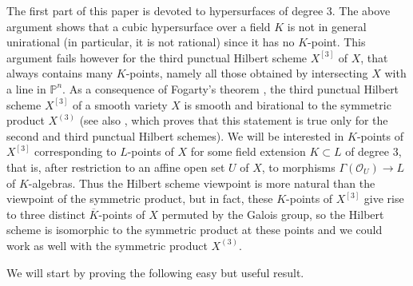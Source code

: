 \documentclass[10pt]{article}
\begin{document}
The first part of this paper is devoted to hypersurfaces of degree $3$. The above argument shows that a cubic  hypersurface over a field $K$ is not in general unirational (in particular, it is not rational) since it has no $K$-point. This argument fails however for the third punctual Hilbert scheme $X^{[3]}$  of $X$, that always contains many $K$-points, namely all  those obtained by intersecting $X$ with a line in $\mathbb{P}^n$. As a consequence of Fogarty's theorem \cite{fogarty}, the third punctual Hilbert scheme $X^{[3]}$ of a smooth variety $X$  is smooth and birational to the symmetric product  $X^{(3)}$ (see also \cite{cheah}, which proves that this statement is  true only for the second and third punctual Hilbert schemes). We will be interested in $K$-points of $X^{[3]}$ corresponding to $L$-points of $X$ for some field extension $K\subset L$ of degree $3$, that is, after restriction to an affine open set $U$ of $X$, to morphisms $\Gamma(\mathcal{O}_U)\rightarrow L$ of $K$-algebras. Thus the Hilbert scheme viewpoint is more natural than the viewpoint of the symmetric product, but in fact, these $K$-points of $X^{[3]}$ give rise to three distinct $\overline{K}$-points of $X$ permuted by the Galois group, so the Hilbert scheme is isomorphic to the symmetric product at these points and we could work as well with the symmetric product $X^{(3)}$.

We will start by proving the following easy but useful result.
\end{document}
